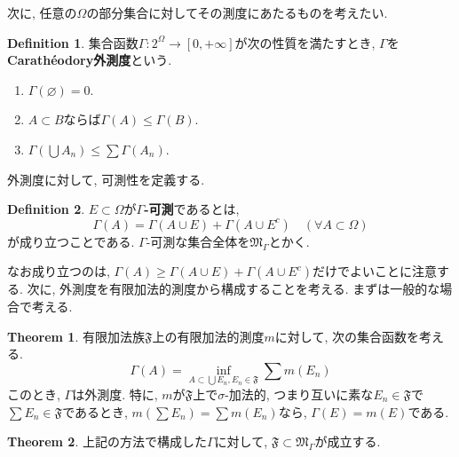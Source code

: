 \documentclass[a4j,dvipdfmx]{jsarticle}
\newcommand{\F}{\mathfrak{F}}
\newcommand{\M}{\mathfrak{M}}
\theoremstyle{definition}
\newtheorem{definition}{Definition}[section]
\theoremstyle{definition}
\newtheorem{theorem}{Theorem}[section]
\numberwithin{equation}{section}
\begin{document}
            次に, 任意の$\Omega$の部分集合に対してその測度にあたるものを考えたい.
            \begin{definition}
                集合函数$\Gamma:2^\Omega\to [0,+\infty]$が次の性質を満たすとき, $\Gamma$を\textbf{Carath\'{e}odory外測度}という.
                \begin{enumerate}\renewcommand{\labelenumi}{(\arabic{enumi})}
                    \item $\Gamma(\varnothing)=0$.
                    \item $A\subset B$ならば$\Gamma(A)\leq\Gamma(B)$.
                    \item $\Gamma(\bigcup A_n)\leq \sum \Gamma(A_n)$.
                \end{enumerate}
            \end{definition}

            外測度に対して, 可測性を定義する.
            \begin{definition}
                $E\subset \Omega$が\textbf{$\Gamma$-可測}であるとは, 
                \begin{equation}
                    \Gamma(A)=\Gamma(A\cup E)+\Gamma(A\cup E^c) \quad (\forall A\subset \Omega)
                \end{equation}
                が成り立つことである. $\Gamma$-可測な集合全体を$\M_\Gamma$とかく.
            \end{definition}
            なお成り立つのは, $\Gamma(A)\geq\Gamma(A\cup E)+\Gamma(A\cup E^c)$だけでよいことに注意する.
            \clearpage
            次に, 外測度を有限加法的測度から構成することを考える. まずは一般的な場合で考える.
            \begin{theorem}
                有限加法族$\F$上の有限加法的測度$m$に対して, 次の集合函数を考える.
                \begin{equation}
                    \Gamma (A) = \inf_{A\subset \bigcup E_n,E_n\in \F}\sum m(E_n)
                \end{equation}
                このとき, $\Gamma$は外測度. 特に, $m$が$\F$上で$\sigma$-加法的, つまり互いに素な$E_n\in \F$で$\sum E_n\in\F$であるとき, $m(\sum E_n)=\sum m(E_n)$なら, $\Gamma (E)=m(E)$である.
            \end{theorem}

            \begin{theorem}
                上記の方法で構成した$\Gamma$に対して, $\F\subset\M_\Gamma$が成立する.
            \end{theorem}
\end{document}
